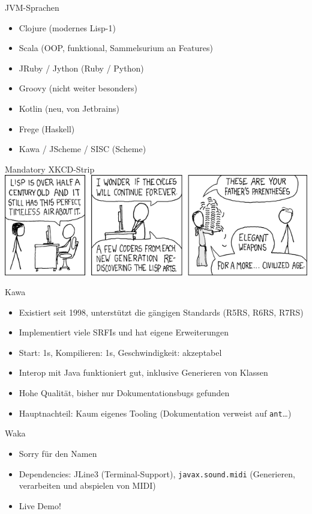 \documentclass[presentation]{beamer}
\begin{document}
\begin{frame}[label=sec-1-7]{JVM-Sprachen}
\begin{itemize}
\item Clojure (modernes Lisp-1)
\item Scala (OOP, funktional, Sammelsurium an Features)
\item JRuby / Jython (Ruby / Python)
\item Groovy (nicht weiter besonders)
\item Kotlin (neu, von Jetbrains)
\item Frege (Haskell)
\item Kawa / JScheme / SISC (Scheme)
\end{itemize}
\end{frame}

\begin{frame}[label=sec-1-8]{Mandatory XKCD-Strip}
\includegraphics[width=.9\linewidth]{./img/lisp_cycles.png}
\end{frame}

\begin{frame}[fragile,label=sec-1-9]{Kawa}
 \begin{itemize}
\item Existiert seit 1998, unterstützt die gängigen Standards (R5RS, R6RS,
R7RS)
\item Implementiert viele SRFIs und hat eigene Erweiterungen
\item Start: 1s, Kompilieren: 1s, Geschwindigkeit: akzeptabel
\item Interop mit Java funktioniert gut, inklusive Generieren von Klassen
\item Hohe Qualität, bisher nur Dokumentationsbugs gefunden
\item Hauptnachteil: Kaum eigenes Tooling (Dokumentation verweist auf
\texttt{ant}\ldots{})
\end{itemize}
\end{frame}

\begin{frame}[fragile,label=sec-1-10]{Waka}
 \begin{itemize}
\item Sorry für den Namen
\item Dependencies: JLine3 (Terminal-Support), \texttt{javax.sound.midi}
  (Generieren, verarbeiten und abspielen von MIDI)
\item Live Demo!
\end{itemize}
\end{frame}
\end{document}
